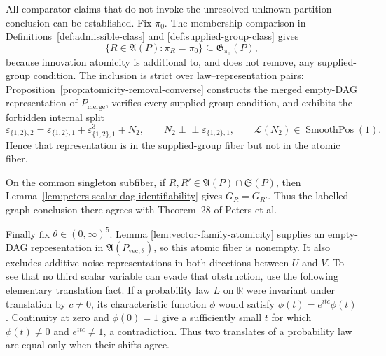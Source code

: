 All comparator claims that do not invoke the unresolved unknown-partition
conclusion can be established.  Fix \(\pi_0\).  The membership comparison in
Definitions~\ref{def:admissible-class} and
\ref{def:supplied-group-class} gives
\[
 \{R\in\mathfrak A(P):\pi_R=\pi_0\}
 \subseteq \mathfrak G_{\pi_0}(P),
\]
because innovation atomicity is additional to, and does not remove, any
supplied-group condition.  The inclusion is strict over law--representation
pairs: Proposition~\ref{prop:atomicity-removal-converse} constructs the merged
empty-DAG representation of \(P_{\mathrm{merge}}\), verifies every
supplied-group condition, and exhibits the forbidden internal split
\[
 \varepsilon_{\{1,2\},2}
 =\varepsilon_{\{1,2\},1}+\varepsilon_{\{1,2\},1}^{3}+N_2,
 \qquad
 N_2\perp\!\!\!\perp\varepsilon_{\{1,2\},1},
 \qquad
 \mathcal L(N_2)\in\operatorname{SmoothPos}(1).
\]
Hence that representation is in the supplied-group fiber but not in the
atomic fiber.

On the common singleton subfiber, if
\(R,R'\in\mathfrak A(P)\cap\mathfrak S(P)\), then
Lemma~\ref{lem:peters-scalar-dag-identifiability} gives \(G_R=G_{R'}\).
Thus the labelled graph conclusion there agrees with Theorem~28 of Peters et
al.

Finally fix \(\theta\in(0,\infty)^5\).  Lemma
\ref{lem:vector-family-atomicity} supplies an empty-DAG representation in
\(\mathfrak A(P_{\mathrm{vec},\theta})\), so this atomic fiber is nonempty.
It also excludes additive-noise representations in both directions between
\(U\) and \(V\).  To see that no third scalar variable can evade that
obstruction, use the following elementary translation fact.  If a probability
law \(L\) on \(\mathbb R\) were invariant under translation by \(c\ne0\), its
characteristic function \(\phi\) would satisfy
\(\phi(t)=e^{itc}\phi(t)\).  Continuity at zero and \(\phi(0)=1\) give a
sufficiently small \(t\) for which \(\phi(t)\ne0\) and \(e^{itc}\ne1\), a
contradiction.  Thus two translates of a probability law are equal only when
their shifts agree.

